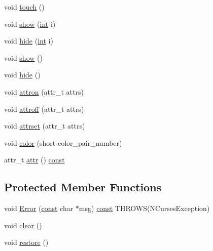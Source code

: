 \begin{DoxyCompactItemize}
void \hyperlink{class_soft___label___key___set_acca88f0ec08f0df41c423bfe2d3618c4}{touch} ()
\item 
void \hyperlink{class_soft___label___key___set_a21f647531cd4cc831fd5d39c45e83997}{show} (\hyperlink{term__entry_8h_ad65b480f8c8270356b45a9890f6499ae}{int} i)
\item 
void \hyperlink{class_soft___label___key___set_a100e45749c896da7005c15bf0403d57d}{hide} (\hyperlink{term__entry_8h_ad65b480f8c8270356b45a9890f6499ae}{int} i)
\item 
void \hyperlink{class_soft___label___key___set_a1a2ffcb9a7846befa4403c71381a9ad4}{show} ()
\item 
void \hyperlink{class_soft___label___key___set_a0ffd875b8387350bfc1a37528fbbc22b}{hide} ()
\item 
void \hyperlink{class_soft___label___key___set_a06c339c7399cf7e0c912ef0f29bad98c}{attron} (attr\-\_\-t attrs)
\item 
void \hyperlink{class_soft___label___key___set_afbb70dd48ac96841786dd6578183b1a9}{attroff} (attr\-\_\-t attrs)
\item 
void \hyperlink{class_soft___label___key___set_ada71d80091b80a1be9d59785dbff2306}{attrset} (attr\-\_\-t attrs)
\item 
void \hyperlink{class_soft___label___key___set_adb8343a821e9de23596452371e0a77a7}{color} (short color\-\_\-pair\-\_\-number)
\item 
attr\-\_\-t \hyperlink{class_soft___label___key___set_a22f256eaf9dc597423172549dcd26220}{attr} () \hyperlink{term__entry_8h_a57bd63ce7f9a353488880e3de6692d5a}{const} 
\end{DoxyCompactItemize}
\subsection*{Protected Member Functions}
\begin{DoxyCompactItemize}
\item 
void \hyperlink{class_soft___label___key___set_a48bc77e11e6022d1ee9f9892966e7555}{Error} (\hyperlink{term__entry_8h_a57bd63ce7f9a353488880e3de6692d5a}{const} char $\ast$msg) \hyperlink{term__entry_8h_a57bd63ce7f9a353488880e3de6692d5a}{const} T\-H\-R\-O\-W\-S(N\-Curses\-Exception)
\item 
void \hyperlink{class_soft___label___key___set_af895c1e3efcf23d8c2c2abe872b8107c}{clear} ()
\item 
void \hyperlink{class_soft___label___key___set_a8d30f410bfe3c44688b6d8ff05ec4ab5}{restore} ()
\end{DoxyCompactItemize}


